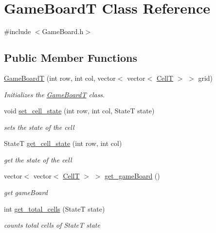 \hypertarget{class_game_board_t}{}\section{Game\+BoardT Class Reference}
\label{class_game_board_t}


{\ttfamily \#include $<$Game\+Board.\+h$>$}

\subsection*{Public Member Functions}
\begin{DoxyCompactItemize}
\item 
\hyperlink{class_game_board_t_a60b58bac7125c2a06630ca20d4e427dc}{Game\+BoardT} (int row, int col, vector$<$ vector$<$ \hyperlink{struct_cell_t}{CellT} $>$ $>$ grid)
\begin{DoxyCompactList}\small\item\em Initializes the \hyperlink{class_game_board_t}{Game\+BoardT} class. \end{DoxyCompactList}\item 
void \hyperlink{class_game_board_t_a6e6acecfa11ce088683f5f8080e5e09a}{set\+\_\+cell\+\_\+state} (int row, int col, StateT state)
\begin{DoxyCompactList}\small\item\em sets the state of the cell \end{DoxyCompactList}\item 
StateT \hyperlink{class_game_board_t_a1778f366be354f698988f3bfc86783b1}{get\+\_\+cell\+\_\+state} (int row, int col)
\begin{DoxyCompactList}\small\item\em get the state of the cell \end{DoxyCompactList}\item 
vector$<$ vector$<$ \hyperlink{struct_cell_t}{CellT} $>$ $>$ \hyperlink{class_game_board_t_a774e3b1242c87924b498a798d2804553}{get\+\_\+game\+Board} ()
\begin{DoxyCompactList}\small\item\em get game\+Board \end{DoxyCompactList}\item 
int \hyperlink{class_game_board_t_abedcbf2eaee7571a1fa50b04e0b4b486}{get\+\_\+total\+\_\+cells} (StateT state)
\begin{DoxyCompactList}\small\item\em counts total cells of StateT state \end{DoxyCompactList}\item 

\end{DoxyCompactItemize}
